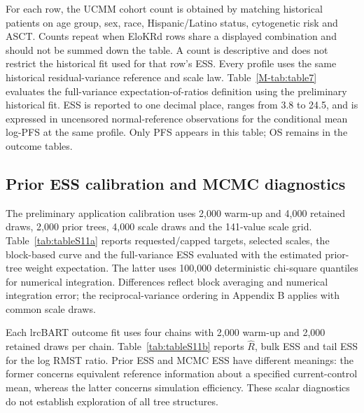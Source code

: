 For each row, the UCMM cohort count is obtained by matching historical patients on age group, sex, race, Hispanic/Latino status, cytogenetic risk and ASCT. Counts repeat when EloKRd rows share a displayed combination and should not be summed down the table. A count is descriptive and does not restrict the historical fit used for that row's ESS. Every profile uses the same historical residual-variance reference and scale law. Table~\ref{M-tab:table7} evaluates the full-variance expectation-of-ratios definition using the preliminary historical fit. ESS is reported to one decimal place, ranges from 3.8 to 24.5, and is expressed in uncensored normal-reference observations for the conditional mean log-PFS at the same profile. Only PFS appears in this table; OS remains in the outcome tables.

\subsection{Prior ESS calibration and MCMC diagnostics}\label{sec:F.4}
The preliminary application calibration uses 2,000 warm-up and 4,000 retained draws, 2,000 prior trees, 4,000 scale draws and the 141-value scale grid. Table~\ref{tab:tableS11a} reports requested/capped targets, selected scales, the block-based curve and the full-variance ESS evaluated with the estimated prior-tree weight expectation. The latter uses 100,000 deterministic chi-square quantiles for numerical integration. Differences reflect block averaging and numerical integration error; the reciprocal-variance ordering in Appendix B applies with common scale draws.

Each lrcBART outcome fit uses four chains with 2,000 warm-up and 2,000 retained draws per chain. Table~\ref{tab:tableS11b} reports $\widehat R$, bulk ESS and tail ESS for the log RMST ratio. Prior ESS and MCMC ESS have different meanings: the former concerns equivalent reference information about a specified current-control mean, whereas the latter concerns simulation efficiency. These scalar diagnostics do not establish exploration of all tree structures.
\renewcommand{\thetable}{S11(a)}

\clearpage
\renewcommand{\thetable}{S11(b)}

\renewcommand{\thetable}{S\arabic{table}}
\clearpage
